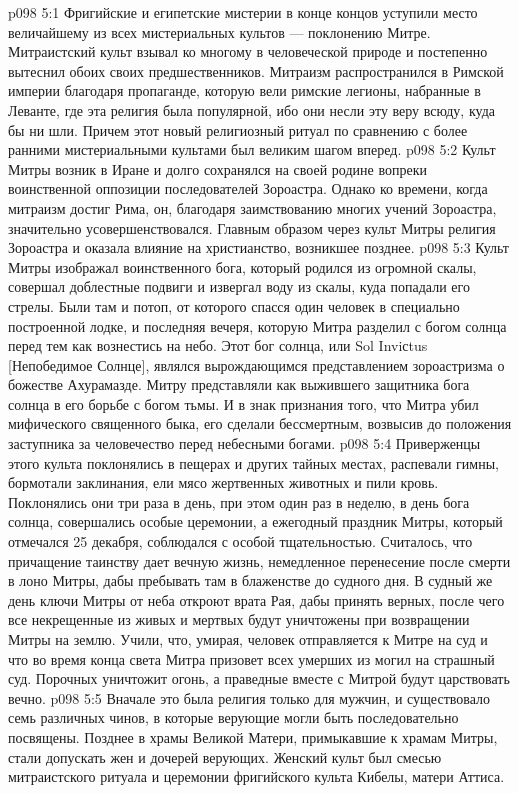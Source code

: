 \vs p098 5:1 Фригийские и египетские мистерии в конце концов уступили место величайшему из всех мистериальных культов --- поклонению Митре. Митраистский культ взывал ко многому в человеческой природе и постепенно вытеснил обоих своих предшественников. Митраизм распространился в Римской империи благодаря пропаганде, которую вели римские легионы, набранные в Леванте, где эта религия была популярной, ибо они несли эту веру всюду, куда бы ни шли. Причем этот новый религиозный ритуал по сравнению с более ранними мистериальными культами был великим шагом вперед.
\vs p098 5:2 Культ Митры возник в Иране и долго сохранялся на своей родине вопреки воинственной оппозиции последователей Зороастра. Однако ко времени, когда митраизм достиг Рима, он, благодаря заимствованию многих учений Зороастра, значительно усовершенствовался. Главным образом через культ Митры религия Зороастра и оказала влияние на христианство, возникшее позднее.
\vs p098 5:3 \pc Культ Митры изображал воинственного бога, который родился из огромной скалы, совершал доблестные подвиги и извергал воду из скалы, куда попадали его стрелы. Были там и потоп, от которого спасся один человек в специально построенной лодке, и последняя вечеря, которую Митра разделил с богом солнца перед тем как вознестись на небо. Этот бог солнца, или Sol Inviсtus [Непобедимое Солнце], являлся вырождающимся представлением зороастризма о божестве Ахурамазде. Митру представляли как выжившего защитника бога солнца в его борьбе с богом тьмы. И в знак признания того, что Митра убил мифического священного быка, его сделали бессмертным, возвысив до положения заступника за человечество перед небесными богами.
\vs p098 5:4 Приверженцы этого культа поклонялись в пещерах и других тайных местах, распевали гимны, бормотали заклинания, ели мясо жертвенных животных и пили кровь. Поклонялись они три раза в день, при этом один раз в неделю, в день бога солнца, совершались особые церемонии, а ежегодный праздник Митры, который отмечался 25 декабря, соблюдался с особой тщательностью. Считалось, что причащение таинству дает вечную жизнь, немедленное перенесение после смерти в лоно Митры, дабы пребывать там в блаженстве до судного дня. В судный же день ключи Митры от неба откроют врата Рая, дабы принять верных, после чего все некрещенные из живых и мертвых будут уничтожены при возвращении Митры на землю. Учили, что, умирая, человек отправляется к Митре на суд и что во время конца света Митра призовет всех умерших из могил на страшный суд. Порочных уничтожит огонь, а праведные вместе с Митрой будут царствовать вечно.
\vs p098 5:5 Вначале это была религия только для мужчин, и существовало семь различных чинов, в которые верующие могли быть последовательно посвящены. Позднее в храмы Великой Матери, примыкавшие к храмам Митры, стали допускать жен и дочерей верующих. Женский культ был смесью митраистского ритуала и церемонии фригийского культа Кибелы, матери Аттиса.

